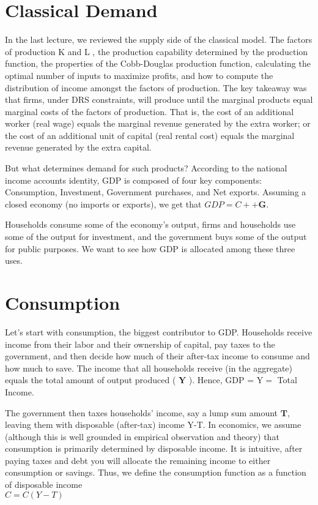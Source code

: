 \documentclass[10pt]{article}
\begin{document}
\section*{Classical Demand}
In the last lecture, we reviewed the supply side of the classical model. The factors of production K and L , the production capability determined by the production function, the properties of the Cobb-Douglas production function, calculating the optimal number of inputs to maximize profits, and how to compute the distribution of income amongst the factors of production. The key takeaway was that firms, under DRS constraints, will produce until the marginal products equal marginal costs of the factors of production. That is, the cost of an additional worker (real wage) equals the marginal revenue generated by the extra worker; or the cost of an additional unit of capital (real rental cost) equals the marginal revenue generated by the extra capital.

But what determines demand for such products? According to the national income accounts identity, GDP is composed of four key components: Consumption, Investment, Government purchases, and Net exports. Assuming a closed economy (no imports or exports), we get that $G D P=C+\boldsymbol{+} \boldsymbol{G}$.

Households consume some of the economy's output, firms and households use some of the output for investment, and the government buys some of the output for public purposes. We want to see how GDP is allocated among these three uses.

\section*{Consumption}
Let's start with consumption, the biggest contributor to GDP. Households receive income from their labor and their ownership of capital, pay taxes to the government, and then decide how much of their after-tax income to consume and how much to save. The income that all households receive (in the aggregate) equals the total amount of output produced ( $\mathbf{Y}$ ). Hence, GDP = $\mathrm{Y}=$ Total Income.

The government then taxes households' income, say a lump sum amount $\mathbf{T}$, leaving them with disposable (after-tax) income Y-T. In economics, we assume (although this is well grounded in empirical observation and theory) that consumption is primarily determined by disposable income. It is intuitive, after paying taxes and debt you will allocate the remaining income to either consumption or savings. Thus, we define the consumption function as a function of disposable income\\
$C=C(Y-T)$
\end{document}
